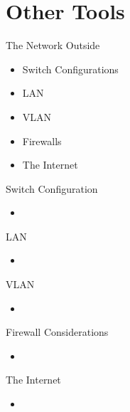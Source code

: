 \section{Other Tools}

\begin{frame}
   {The Network Outside}
      \begin{itemize}
         \item Switch Configurations
	 \item LAN
	 \item VLAN
	 \item Firewalls
	 \item The Internet
      \end{itemize}


\end{frame}

\cprotect\note{

}

\begin{frame}
   {Switch Configuration}
      \begin{itemize}
         \item
      \end{itemize}


\end{frame}

\cprotect\note{

}
\begin{frame}
   {LAN}
      \begin{itemize}
         \item
      \end{itemize}


\end{frame}

\cprotect\note{

}
\begin{frame}
   {VLAN}
      \begin{itemize}
         \item
      \end{itemize}


\end{frame}

\cprotect\note{

}
\begin{frame}
   {Firewall Considerations}
      \begin{itemize}
         \item
      \end{itemize}


\end{frame}

\cprotect\note{

}
\begin{frame}
   {The Internet}
      \begin{itemize}
         \item
      \end{itemize}


\end{frame}

\cprotect\note{

}


